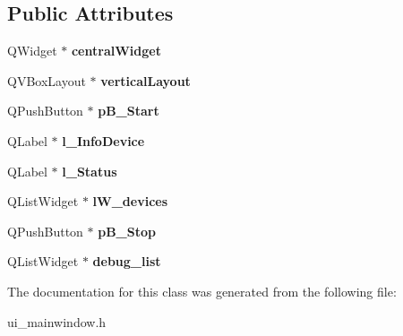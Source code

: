 \subsection*{Public Attributes}
\begin{DoxyCompactItemize}
\item 
Q\+Widget $\ast$ {\bfseries central\+Widget}\hypertarget{classUi__MainWindow_a30075506c2116c3ed4ff25e07ae75f81}{}\label{classUi__MainWindow_a30075506c2116c3ed4ff25e07ae75f81}

\item 
Q\+V\+Box\+Layout $\ast$ {\bfseries vertical\+Layout}\hypertarget{classUi__MainWindow_aecd96a04789fcfec3f98d80390ad8184}{}\label{classUi__MainWindow_aecd96a04789fcfec3f98d80390ad8184}

\item 
Q\+Push\+Button $\ast$ {\bfseries p\+B\+\_\+\+Start}\hypertarget{classUi__MainWindow_ae290c85e018eadf706a4cd4c1f761dba}{}\label{classUi__MainWindow_ae290c85e018eadf706a4cd4c1f761dba}

\item 
Q\+Label $\ast$ {\bfseries l\+\_\+\+Info\+Device}\hypertarget{classUi__MainWindow_a4b6078d9c8fe71e0587c06ce0611fd62}{}\label{classUi__MainWindow_a4b6078d9c8fe71e0587c06ce0611fd62}

\item 
Q\+Label $\ast$ {\bfseries l\+\_\+\+Status}\hypertarget{classUi__MainWindow_a4e799c380370cb69ba4d46877126a272}{}\label{classUi__MainWindow_a4e799c380370cb69ba4d46877126a272}

\item 
Q\+List\+Widget $\ast$ {\bfseries l\+W\+\_\+devices}\hypertarget{classUi__MainWindow_acf824f57461de0d22f633ac131a480e2}{}\label{classUi__MainWindow_acf824f57461de0d22f633ac131a480e2}

\item 
Q\+Push\+Button $\ast$ {\bfseries p\+B\+\_\+\+Stop}\hypertarget{classUi__MainWindow_ae3797ec0ac81096fee0a086d5093b6be}{}\label{classUi__MainWindow_ae3797ec0ac81096fee0a086d5093b6be}

\item 
Q\+List\+Widget $\ast$ {\bfseries debug\+\_\+list}\hypertarget{classUi__MainWindow_a2be3631282a4b282cf165ed6af4c5868}{}\label{classUi__MainWindow_a2be3631282a4b282cf165ed6af4c5868}

\end{DoxyCompactItemize}


The documentation for this class was generated from the following file\+:\begin{DoxyCompactItemize}
\item 
ui\+\_\+mainwindow.\+h\end{DoxyCompactItemize}
